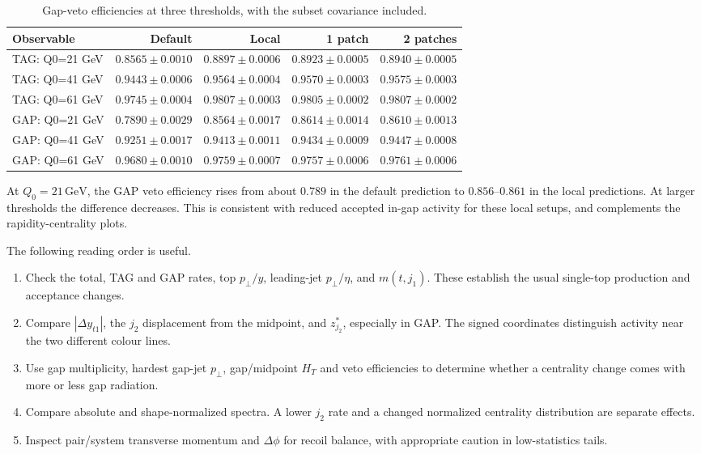 \documentclass[11pt,a4paper]{article}
\newcommand{\GeV}{\,\mathrm{GeV}}
\begin{document}
\begin{table}[htbp]
\centering\small
\begin{tabular}{@{}lrrrr@{}}
\toprule
Observable & Default & Local & 1 patch & 2 patches\\
\midrule
TAG: Q0=21 GeV & $0.8565\pm0.0010$ & $0.8897\pm0.0006$ & $0.8923\pm0.0005$ & $0.8940\pm0.0005$ \\
TAG: Q0=41 GeV & $0.9443\pm0.0006$ & $0.9564\pm0.0004$ & $0.9570\pm0.0003$ & $0.9575\pm0.0003$ \\
TAG: Q0=61 GeV & $0.9745\pm0.0004$ & $0.9807\pm0.0003$ & $0.9805\pm0.0002$ & $0.9807\pm0.0002$ \\
GAP: Q0=21 GeV & $0.7890\pm0.0029$ & $0.8564\pm0.0017$ & $0.8614\pm0.0014$ & $0.8610\pm0.0013$ \\
GAP: Q0=41 GeV & $0.9251\pm0.0017$ & $0.9413\pm0.0011$ & $0.9434\pm0.0009$ & $0.9447\pm0.0008$ \\
GAP: Q0=61 GeV & $0.9680\pm0.0010$ & $0.9759\pm0.0007$ & $0.9757\pm0.0006$ & $0.9761\pm0.0006$ \\
\bottomrule
\end{tabular}
\caption{Gap-veto efficiencies at three thresholds, with the subset covariance included.}\label{tab:veto}
\end{table}


At $Q_0=21\GeV$, the GAP veto efficiency rises from about $0.789$ in the
default prediction to $0.856$--$0.861$ in the local predictions. At larger
thresholds the difference decreases. This is consistent with reduced
accepted in-gap activity for these local setups, and complements the
rapidity-centrality plots.

The following reading order is useful.
\begin{enumerate}
\item Check the total, TAG and GAP rates, top $p_\perp/y$, leading-jet
$p_\perp/\eta$, and $m(t,j_1)$. These establish the usual single-top
production and acceptance changes.
\item Compare $|\Delta y_{t1}|$, the $j_2$ displacement from the midpoint,
and $z^*_{j_2}$, especially in GAP. The signed coordinates distinguish
activity near the two different colour lines.
\item Use gap multiplicity, hardest gap-jet $p_\perp$, gap/midpoint $H_T$
and veto efficiencies to determine whether a centrality change comes with
more or less gap radiation.
\item Compare absolute and shape-normalized spectra. A lower $j_2$ rate
and a changed normalized centrality distribution are separate effects.
\item Inspect pair/system transverse momentum and $\Delta\phi$ for recoil
balance, with appropriate caution in low-statistics tails.
\end{enumerate}
\end{document}
